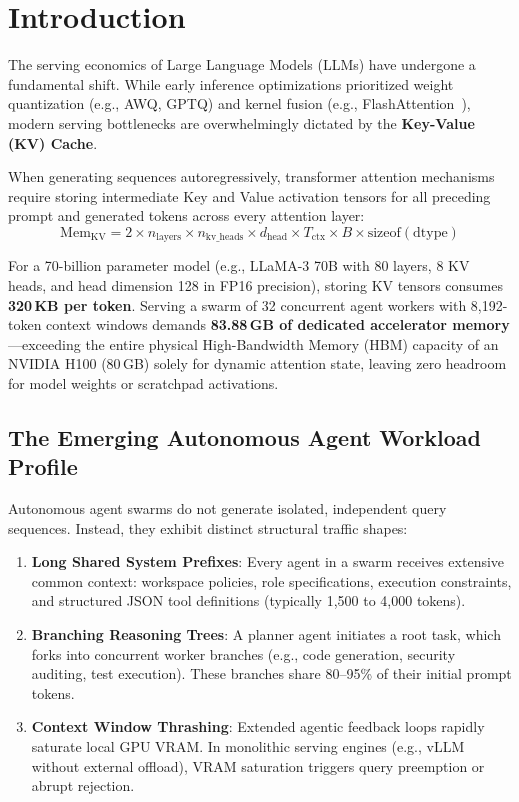 \documentclass[10pt,twocolumn,letterpaper]{article}
\begin{document}
\section{Introduction}

The serving economics of Large Language Models (LLMs) have undergone a fundamental shift. While early inference optimizations prioritized weight quantization (e.g., AWQ, GPTQ) and kernel fusion (e.g., FlashAttention~\cite{dao2022flashattention, dao2024flashattention2}), modern serving bottlenecks are overwhelmingly dictated by the \textbf{Key-Value (KV) Cache}.

When generating sequences autoregressively, transformer attention mechanisms require storing intermediate Key and Value activation tensors for all preceding prompt and generated tokens across every attention layer:
\begin{equation}
\text{Mem}_{\text{KV}} = 2 \times n_{\text{layers}} \times n_{\text{kv\_heads}} \times d_{\text{head}} \times T_{\text{ctx}} \times B \times \text{sizeof}(\text{dtype})
\end{equation}

For a 70-billion parameter model (e.g., LLaMA-3 70B with 80 layers, 8 KV heads, and head dimension 128 in FP16 precision), storing KV tensors consumes \textbf{320\,KB per token}. Serving a swarm of 32 concurrent agent workers with 8,192-token context windows demands \textbf{83.88\,GB of dedicated accelerator memory}---exceeding the entire physical High-Bandwidth Memory (HBM) capacity of an NVIDIA H100 (80\,GB) solely for dynamic attention state, leaving zero headroom for model weights or scratchpad activations.

\subsection{The Emerging Autonomous Agent Workload Profile}
Autonomous agent swarms do not generate isolated, independent query sequences. Instead, they exhibit distinct structural traffic shapes:
\begin{enumerate}
    \item \textbf{Long Shared System Prefixes}: Every agent in a swarm receives extensive common context: workspace policies, role specifications, execution constraints, and structured JSON tool definitions (typically 1,500 to 4,000 tokens).
    \item \textbf{Branching Reasoning Trees}: A planner agent initiates a root task, which forks into concurrent worker branches (e.g., code generation, security auditing, test execution). These branches share 80--95\% of their initial prompt tokens.
    \item \textbf{Context Window Thrashing}: Extended agentic feedback loops rapidly saturate local GPU VRAM. In monolithic serving engines (e.g., vLLM~\cite{kwon2023pagedattention} without external offload), VRAM saturation triggers query preemption or abrupt rejection.
\end{enumerate}
\end{document}
